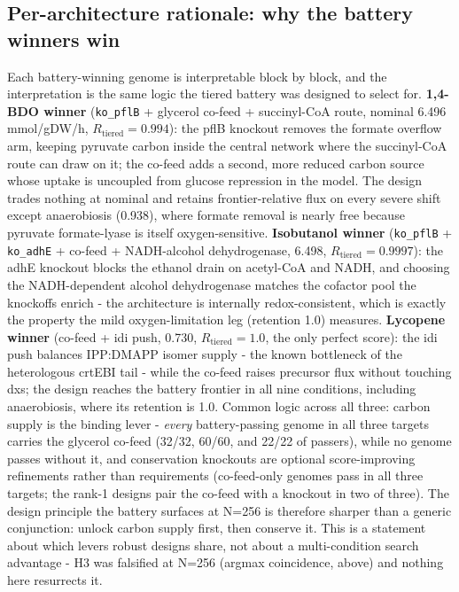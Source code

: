 \documentclass[12pt,a4paper]{article}
\begin{document}
\subsection{Per-architecture rationale: why the battery winners win}
Each battery-winning genome is interpretable block by block, and the interpretation is the same logic the tiered battery was designed to select for. \textbf{1,4-BDO winner} (\texttt{ko\_pflB} + glycerol co-feed + succinyl-CoA route, nominal 6.496 mmol/gDW/h, $R_{\mathrm{tiered}}=0.994$): the pflB knockout removes the formate overflow arm, keeping pyruvate carbon inside the central network where the succinyl-CoA route can draw on it; the co-feed adds a second, more reduced carbon source whose uptake is uncoupled from glucose repression in the model. The design trades nothing at nominal and retains frontier-relative flux on every severe shift except anaerobiosis (0.938), where formate removal is nearly free because pyruvate formate-lyase is itself oxygen-sensitive. \textbf{Isobutanol winner} (\texttt{ko\_pflB} + \texttt{ko\_adhE} + co-feed + NADH-alcohol dehydrogenase, 6.498, $R_{\mathrm{tiered}}=0.9997$): the adhE knockout blocks the ethanol drain on acetyl-CoA and NADH, and choosing the NADH-dependent alcohol dehydrogenase matches the cofactor pool the knockoffs enrich - the architecture is internally redox-consistent, which is exactly the property the mild oxygen-limitation leg (retention 1.0) measures. \textbf{Lycopene winner} (co-feed + idi push, 0.730, $R_{\mathrm{tiered}}=1.0$, the only perfect score): the idi push balances IPP:DMAPP isomer supply - the known bottleneck of the heterologous crtEBI tail - while the co-feed raises precursor flux without touching dxs; the design reaches the battery frontier in all nine conditions, including anaerobiosis, where its retention is 1.0. Common logic across all three: carbon supply is the binding lever - \emph{every} battery-passing genome in all three targets carries the glycerol co-feed (32/32, 60/60, and 22/22 of passers), while no genome passes without it, and conservation knockouts are optional score-improving refinements rather than requirements (co-feed-only genomes pass in all three targets; the rank-1 designs pair the co-feed with a knockout in two of three). The design principle the battery surfaces at N=256 is therefore sharper than a generic conjunction: unlock carbon supply first, then conserve it. This is a statement about which levers robust designs share, not about a multi-condition search advantage - H3 was falsified at N=256 (argmax coincidence, above) and nothing here resurrects it.
\end{document}
